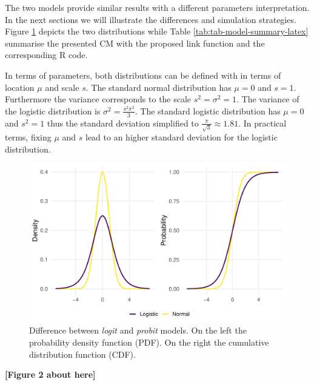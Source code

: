 \documentclass[
  man,floatsintext]{apa6}
\begin{document}
The two models provide similar results with a different parameters interpretation. In the next sections we will illustrate the differences and simulation strategies. Figure \ref{fig:fig-logit-vs-probit} depicts the two distributions while Table \ref{tab:tab-model-summary-latex} summarise the presented CM with the proposed link function and the corresponding R code.

In terms of parameters, both distributions can be defined with in terms of location \(\mu\) and scale \(s\). The standard normal distribution has \(\mu = 0\) and \(s = 1\). Furthermore the variance corresponds to the scale \(s^2 = \sigma^2 = 1\). The variance of the logistic distribution is \(\sigma^2 = \frac{s^2\pi^2}{3}\). The standard logistic distribution has \(\mu = 0\) and \(s^2 = 1\) thus the standard deviation simplified to \(\frac{\pi}{\sqrt{3}} \approx 1.81\). In practical terms, fixing \(\mu\) and \(s\) lead to an higher standard deviation for the logistic distribution.

\scriptsize

\begin{figure}

{\centering \includegraphics[width=1\linewidth]{paper_files/figure-latex/fig-logit-vs-probit-1} 

}

\caption{Difference between \emph{logit} and \emph{probit} models. On the left the probability density function (PDF). On the right the cumulative distribution function (CDF).}\label{fig:fig-logit-vs-probit}
\end{figure}

\begin{center}\textbf{[Figure 2 about here]} \end{center}
\end{document}
